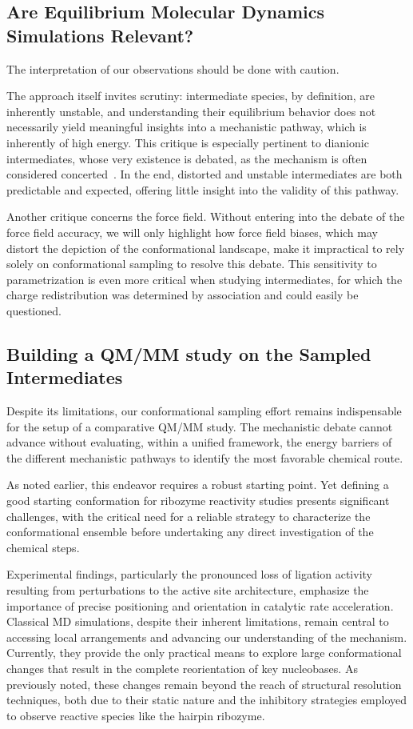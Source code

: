 \documentclass[journal=jacsat,manuscript=article]{achemso}
\begin{document}
\subsection{Are Equilibrium Molecular Dynamics Simulations Relevant?}

The interpretation of our observations should be done with caution.

The approach itself invites scrutiny: intermediate species, by definition, are inherently unstable,
and understanding their equilibrium behavior does not necessarily yield meaningful insights into a mechanistic pathway,
which is inherently of high energy.
This critique is especially pertinent to dianionic intermediates,
whose very existence is debated, as the mechanism is often considered concerted~\cite{mlynsky_comparison_2014,mlynsky_qmmm_2011,nam_electrostatic_2008}.
In the end, distorted and unstable intermediates are both predictable and expected,
offering little insight into the validity of this pathway.

Another critique concerns the force field.
Without entering into the debate of the force field accuracy, we will only highlight how force field biases, 
which may distort the depiction of the conformational landscape,
make it impractical to rely solely on conformational sampling to resolve this debate.
This sensitivity to parametrization is even more critical when studying intermediates,
for which the charge redistribution was determined by association and could easily be questioned.


\subsection{Building a QM/MM study on the Sampled Intermediates}

Despite its limitations, our conformational sampling effort remains indispensable for the setup of a comparative QM/MM study.
The mechanistic debate cannot advance without evaluating, within a unified framework,
the energy barriers of the different mechanistic pathways to identify the most favorable chemical route.

As noted earlier, this endeavor requires a robust starting point.
Yet defining a good starting conformation for ribozyme reactivity studies presents significant challenges,
with the critical need for a reliable strategy
to characterize the conformational ensemble before undertaking any direct investigation of the chemical steps.

Experimental findings, particularly the pronounced loss of ligation activity resulting from perturbations
to the active site architecture, emphasize the importance of precise positioning and orientation
in catalytic rate acceleration.
Classical MD simulations, despite their inherent limitations, remain central to accessing local arrangements
and advancing our understanding of the mechanism.
Currently, they provide the only practical means to explore large conformational changes 
that result in the complete reorientation of key nucleobases.
As previously noted, these changes remain beyond the reach of structural resolution techniques,
both due to their static nature and the inhibitory strategies employed
to observe reactive species like the hairpin ribozyme.
\end{document}
